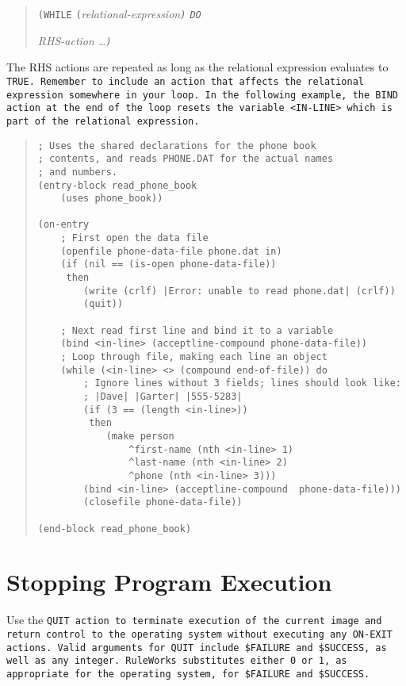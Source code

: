 \begin{quote}
\verb|(WHILE| \verb|(|\it{relational-expression}\verb|)| \verb|DO|\par
\qquad\it{RHS-action} \ldots\verb|)|
\end{quote}

The RHS actions are repeated as long as the relational expression
evaluates to \tt{TRUE}.  Remember to include an action that affects the
relational expression somewhere in your loop.  In the following
example, the \tt{BIND} action at the end of the
loop resets the variable \verb|<IN-LINE>| which is part of the relational
expression.

\begin{quote}
\begin{verbatim}
; Uses the shared declarations for the phone book
; contents, and reads PHONE.DAT for the actual names
; and numbers.
(entry-block read_phone_book
    (uses phone_book))

(on-entry 
    ; First open the data file
    (openfile phone-data-file phone.dat in)
    (if (nil == (is-open phone-data-file))
     then
        (write (crlf) |Error: unable to read phone.dat| (crlf))
        (quit))

    ; Next read first line and bind it to a variable
    (bind <in-line> (acceptline-compound phone-data-file))
    ; Loop through file, making each line an object
    (while (<in-line> <> (compound end-of-file)) do
        ; Ignore lines without 3 fields; lines should look like:
        ; |Dave| |Garter| |555-5283|
        (if (3 == (length <in-line>))
         then
            (make person
                ^first-name (nth <in-line> 1)
                ^last-name (nth <in-line> 2)
                ^phone (nth <in-line> 3)))
        (bind <in-line> (acceptline-compound  phone-data-file)))
        (closefile phone-data-file))

(end-block read_phone_book)
\end{verbatim}
\end{quote}

\section{Stopping Program Execution}

Use the \tt{QUIT} action to terminate execution of the current image
and return control to the operating system without executing any
\tt{ON-EXIT} actions. Valid arguments for \tt{QUIT} include
\verb|$FAILURE| and \verb|$SUCCESS|, as well as any integer.
RuleWorks substitutes either 0 or 1, as appropriate for the operating
system, for \verb|$FAILURE| and \verb|$SUCCESS|.

